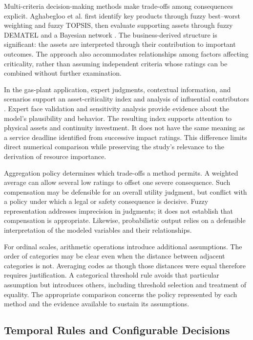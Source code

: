 Multi-criteria decision-making methods make trade-offs among consequences explicit. Aghabegloo et al. first identify key products through fuzzy best--worst weighting and fuzzy TOPSIS, then evaluate supporting assets through fuzzy DEMATEL and a Bayesian network \cite{assetcriticality2023}. The business-derived structure is significant: the assets are interpreted through their contribution to important outcomes. The approach also accommodates relationships among factors affecting criticality, rather than assuming independent criteria whose ratings can be combined without further examination.

In the gas-plant application, expert judgments, contextual information, and scenarios support an asset-criticality index and analysis of influential contributors \cite{assetcriticality2023}. Expert face validation and sensitivity analysis provide evidence about the model's plausibility and behavior. The resulting index supports attention to physical assets and continuity investment. It does not have the same meaning as a service deadline identified from successive impact ratings. This difference limits direct numerical comparison while preserving the study's relevance to the derivation of resource importance.

Aggregation policy determines which trade-offs a method permits. A weighted average can allow several low ratings to offset one severe consequence. Such compensation may be defensible for an overall utility judgment, but conflict with a policy under which a legal or safety consequence is decisive. Fuzzy representation addresses imprecision in judgments; it does not establish that compensation is appropriate. Likewise, probabilistic output relies on a defensible interpretation of the modeled variables and their relationships.

For ordinal scales, arithmetic operations introduce additional assumptions. The order of categories may be clear even when the distance between adjacent categories is not. Averaging codes as though those distances were equal therefore requires justification. A categorical threshold rule avoids that particular assumption but introduces others, including threshold selection and treatment of equality. The appropriate comparison concerns the policy represented by each method and the evidence available to sustain its assumptions.

\subsection{Temporal Rules and Configurable Decisions}
\label{sec:lr_rules}

